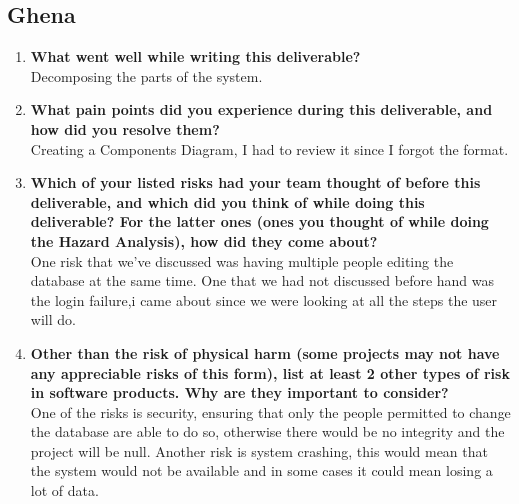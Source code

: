 \documentclass{article}
\begin{document}
\subsection*{Ghena}
\begin{enumerate}
    \item \textbf{What went well while writing this deliverable?}\\
    Decomposing the parts of the system.
    \item \textbf{What pain points did you experience during this deliverable, and how
    did you resolve them?}\\
    Creating a Components Diagram, I had to review it since I forgot the format.
    \item \textbf{Which of your listed risks had your team thought of before this
    deliverable, and which did you think of while doing this deliverable? For
    the latter ones (ones you thought of while doing the Hazard Analysis), how
    did they come about?}\\
    One risk that we've discussed was having multiple people editing the database at the same time. One that we had not discussed before hand was the login failure,i came about since we were looking at all the steps the user will do.
    \item \textbf{Other than the risk of physical harm (some projects may not have any
    appreciable risks of this form), list at least 2 other types of risk in
    software products. Why are they important to consider?} \\
    One of the risks is security, ensuring that only the people permitted to change the database are able to do so,  otherwise there would be no integrity and the project will be null.
    Another risk is system crashing, this would mean that the system would not be available and in some cases it could mean losing a lot of data.
  \end{enumerate}
\end{document}
